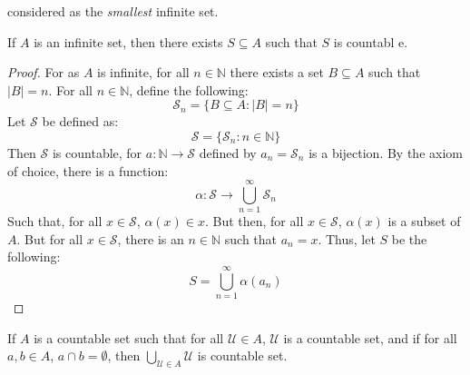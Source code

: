 \documentclass[crop=false,class=book,oneside]{standalone}
\begin{document}
            considered as the \textit{smallest} infinite set.
            \begin{theorem}
                If $A$ is an infinite set, then there exists
                $S\subseteq{A}$ such that $S$ is countabl e.
            \end{theorem}
            \begin{proof}
                For as $A$ is infinite, for all $n\in\mathbb{N}$
                there exists a set $B\subseteq{A}$ such that
                $|B|=n$. For all $n\in\mathbb{N}$,
                define the following:
                \begin{equation}
                    \mathcal{S}_{n}=\{B\subseteq{A}:|B|=n\}
                \end{equation}
                Let $\mathcal{S}$ be defined as:
                \begin{equation}
                    \mathcal{S}=\{\mathcal{S}_{n}:n\in\mathbb{N}\}
                \end{equation}
                Then $\mathcal{S}$ is countable, for
                $a:\mathbb{N}\rightarrow\mathcal{S}$ defined
                by $a_{n}=\mathcal{S}_{n}$ is a bijection.
                By the axiom of choice, there is a function:
                \begin{equation}
                    \alpha:\mathcal{S}\rightarrow
                    \bigcup_{n=1}^{\infty}\mathcal{S}_{n}
                \end{equation}
                Such that, for all $x\in\mathcal{S}$,
                $\alpha(x)\in{x}$. But then, for all
                $x\in\mathcal{S}$, $\alpha(x)$ is a subset
                of $A$. But for all $x\in\mathcal{S}$, there
                is an $n\in\mathbb{N}$ such that
                $a_{n}=x$. Thus, let $S$ be the following:
                \begin{equation}
                    S=\bigcup_{n=1}^{\infty}\alpha(a_{n})
                \end{equation}
            \end{proof}
            \begin{theorem}
                \label{thm:Funct_Countable_Union_of_Countable}
                If $A$ is a countable set such that for all
                $\mathcal{U}\in{A}$, $\mathcal{U}$ is a
                countable set, and if for all $a,b\in{A}$,
                $a\cap{b}=\emptyset$, then
                $\bigcup_{\mathcal{U}\in{A}}\mathcal{U}$
                is countable set.
            \end{theorem}
\end{document}
